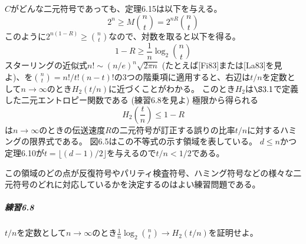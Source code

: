\documentclass[12pt,a4paper]{article}
\begin{document}
    $C$がどんな二元符号であっても、定理6.15は以下を与える。
    \[ 2^n \geq M \binom{n}{t} = 2^{nR} \binom{n}{t} \]
    このように$2^{n(1-R)} \geq \binom{n}{t}$なので、対数を取ると以下を得る。
    \[ 1 - R \geq \frac{1}{n} \log_2 \binom{n}{t} \]
    スターリングの近似式$n! \sim {(n/e)}^n \sqrt{2 \pi n}$ (たとえば[Fi83]または[La83]を見よ)、を$\binom{n}{t} = n! / t! (n - t)! $の3つの階乗項に適用すると、右辺は$t/n$を定数として$n \rightarrow \infty$のとき$H_2 (t/n)$に近づくことがわかる。
    このとき$H_2$は$\S 3.1$で定義した二元エントロピー関数である (練習6.8を見よ)
    極限から得られる
    \[ H_2(\frac{t}{n}) \leq 1 - R \]
    は$n \rightarrow \infty$のときの伝送速度$R$の二元符号が訂正する誤りの比率$t/n$に対するハミングの限界式である。
    図6.5はこの不等式の示す領域を表している。
    $d \leq n$かつ定理6.10が$t = \lfloor (d - 1) / 2 \rfloor $を与えるので$t/n < 1/2$である。

    この領域のどの点が反復符号やパリティ検査符号、ハミング符号などの様々な二元符号のどれに対応しているかを決定するのはよい練習問題である。

      \subparagraph{練習6.8}
        $t/n$を定数として$n \rightarrow \infty$のとき$\frac{1}{n} \log_2 \binom{n}{t} \rightarrow H_2(t/n)$を証明せよ。
\end{document}
